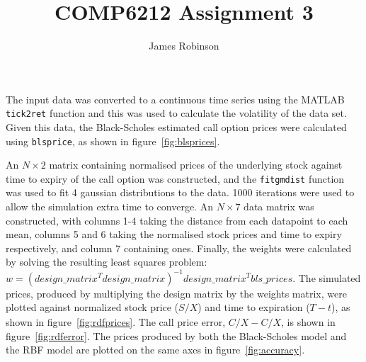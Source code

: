 \documentclass[12pt]{article}
\title{COMP6212 Assignment 3}
\author{James Robinson}
\begin{document}
	\maketitle

  The input data was converted to a continuous time series using the MATLAB \texttt{tick2ret} function and this was used to calculate the volatility of the data set. Given this data, the Black-Scholes estimated call option prices were calculated using \texttt{blsprice}, as shown in figure~\ref{fig:blsprices}.

  An $N \times 2$ matrix containing normalised prices of the underlying stock against time to expiry of the call option was constructed, and the \texttt{fitgmdist} function was used to fit 4 gaussian distributions to the data. 1000 iterations were used to allow the simulation extra time to converge. An $N \times 7$ data matrix was constructed, with columns 1-4 taking the distance from each datapoint to each mean, columns 5 and 6 taking the normalised stock prices and time to expiry respectively, and column 7 containing ones. Finally, the weights were calculated by solving the resulting least squares problem: $w = (design\_matrix^T design\_matrix)^{-1} design\_matrix^T bls\_prices$. The simulated prices, produced by multiplying the design matrix by the weights matrix, were plotted against normalized stock price ($S/X$) and time to expiration ($T - t$), as shown in figure~\ref{fig:rdfprices}. The call price error, $\widehat{C / X} - C / X$, is shown in figure~\ref{fig:rdferror}. The prices produced by both the Black-Scholes model and the RBF model are plotted on the same axes in figure~\ref{fig:accuracy}.
\end{document}
